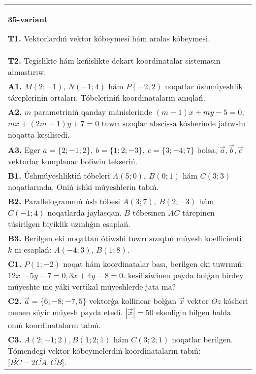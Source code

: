 \documentclass{article}
\begin{document}
\begin{tabular}{m{17cm}}
\textbf{35-variant}

\textbf{T1.} 
Vektorlardıń vektor kóbeymesi hám aralas kóbeymesi.
 \\
\textbf{T2.} 
Tegislikte hám keńislikte dekart koordinatalar sistemasın almastırıw.
 \\
\textbf{A1.} 
$M (2;-1) $, $N (-1;4) $ hám $P (-2;2) $ noqatlar
úshmúyeshlik táreplerinin ortaları. Tóbeleriniń koordinataların
anıqlań.
 \\
\textbf{A2.} 
$m$ parametriniń qanday mánislerinde
$ (m-1) x+my-5=0$, $mx+ (2m-1) y+7=0$ tuwrı sızıqlar abscissa
kósherinde jatıwshı noqatta kesilisedi.
 \\
\textbf{A3.} 
Eger \(a = \{ 2; - 1;2\}, \ b = \{ 1;2; - 3\}, \ c = \{ 3; - 4;7\}\) bolsa, $\overrightarrow{a}, \overrightarrow{b}, \overrightarrow{c}$ vektorlar komplanar boliwin tekseriń.
 \\
\textbf{B1.} 
Úshmúyeshliktiń tóbeleri \(A (5;0),\ B (0;1) \) hám \(C (3;3) \)
noqatlarında. Oniń ishki múyeshlerin tabıń.
 \\
\textbf{B2.} 
Parallelogramnıń úsh tóbesi \(A (3;7),\ B (2;-3) \) hám
\(C (-1;4) \) noqatlarda jaylasqan. $B$ tóbesinen $AC$
tárepinen túsirilgen biyiklik uzınlıǵın esaplań.
 \\
\textbf{B3.} 
Berilgen eki noqattan ótiwshi tuwrı sızıqtıń múyesh
koefficienti $k$ nı esaplań: $A (-4;3) $, $B (1;8) $.
 \\
\textbf{C1.} 
\(P (1;-2) \) noqat hám koordinatalar bası, berilgen eki
tuwrınıń: $12x-5y-7=0, 3x+4y-8=0$.
kesilisiwinen payda bolǵan birdey múyeshte me yáki vertikal
múyeshlerde jata ma?
 \\
\textbf{C2.} 
$\vec{a} = \{ 6; - 8; - 7,5\}$ vektorģa kollinear bolǵan $\vec{x}$ vektor $Oz$ kósheri menen súyir múyesh payda etedi. $|\vec{x}| = 50$ ekenligin bilgen halda onıń koordinataların tabıń.
 \\
\textbf{C3.} 
$A (2; -1;2), B (1;2; 1) $ hám $C (3;2;1) $ noqatlar berilgen. Tómendegi vektor kóbeymelerdiń koordinataların tabıń:
$\lbrack\overline{BC} - 2\overline{CA},\overline{CB}\rbrack$. \\

\end{tabular}
\vspace{1cm}
\end{document}
